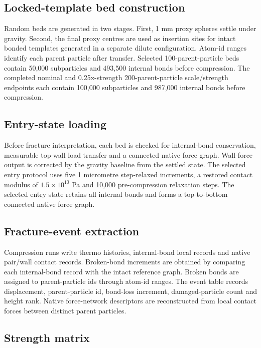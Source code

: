 \documentclass[preprint,12pt]{elsarticle}
\begin{document}
\subsection{Locked-template bed construction}

Random beds are generated in two stages. First, 1 mm proxy spheres settle under gravity. Second, the final proxy centres are used as insertion sites for intact bonded templates generated in a separate dilute configuration. Atom-id ranges identify each parent particle after transfer. Selected 100-parent-particle beds contain 50,000 subparticles and 493,500 internal bonds before compression. The completed nominal and 0.25x-strength 200-parent-particle scale/strength endpoints each contain 100,000 subparticles and 987,000 internal bonds before compression.


\subsection{Entry-state loading}

Before fracture interpretation, each bed is checked for internal-bond conservation, measurable top-wall load transfer and a connected native force graph. Wall-force output is corrected by the gravity baseline from the settled state. The selected entry protocol uses five 1 micrometre step-relaxed increments, a restored contact modulus of $1.5\times10^{10}$ Pa and 10,000 pre-compression relaxation steps. The selected entry state retains all internal bonds and forms a top-to-bottom connected native force graph.


\subsection{Fracture-event extraction}

Compression runs write thermo histories, internal-bond local records and native pair/wall contact records. Broken-bond increments are obtained by comparing each internal-bond record with the intact reference graph. Broken bonds are assigned to parent-particle ids through atom-id ranges. The event table records displacement, parent-particle id, bond-loss increment, damaged-particle count and height rank. Native force-network descriptors are reconstructed from local contact forces between distinct parent particles.


\subsection{Strength matrix}
\end{document}
